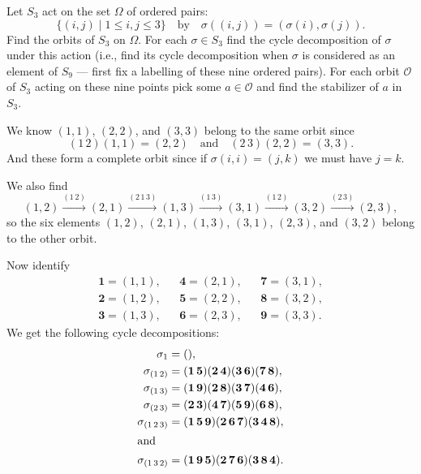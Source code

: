  Let $S_3$ act on the set $\Omega$ of ordered pairs:
\begin{equation*}
  \{(i,j)\mid1\leq i,j\leq3\} \quad\text{by}\quad
  \sigma((i,j)) = (\sigma(i), \sigma(j)).
\end{equation*}
Find the orbits of $S_3$ on $\Omega$. For each $\sigma\in S_3$ find
the cycle decomposition of $\sigma$ under this action (i.e., find its
cycle decomposition when $\sigma$ is considered as an element of $S_9$
--- first fix a labelling of these nine ordered pairs). For each orbit
$\mathcal{O}$ of $S_3$ acting on these nine points pick some
$a\in\mathcal{O}$ and find the stabilizer of $a$ in $S_3$.
\begin{solution}
  We know $(1,1)$, $(2,2)$, and $(3,3)$ belong to the same orbit since
  \begin{equation*}
    (1\,2)(1,1) = (2,2) \quad\text{and}\quad
    (2\,3)(2,2) = (3,3).
  \end{equation*}
  And these form a complete orbit since if $\sigma(i,i) = (j,k)$ we
  must have $j = k$.

  We also find
  \begin{equation*}
    (1,2)
    \xrightarrow{(1\,2)} (2,1)
    \xrightarrow{(2\,1\,3)} (1,3)
    \xrightarrow{(1\,3)} (3,1)
    \xrightarrow{(1\,2)} (3,2)
    \xrightarrow{(2\,3)} (2,3),
  \end{equation*}
  so the six elements $(1,2)$, $(2,1)$, $(1,3)$, $(3,1)$, $(2,3)$, and
  $(3,2)$ belong to the other orbit.

  Now identify
  \begin{align*}
    \mathbf1 = (1,1), && \mathbf4 = (2,1), && \mathbf7 = (3,1), \\
    \mathbf2 = (1,2), && \mathbf5 = (2,2), && \mathbf8 = (3,2), \\
    \mathbf3 = (1,3), && \mathbf6 = (2,3), && \mathbf9 = (3,3).
  \end{align*}
  We get the following cycle decompositions:
  \begin{align*}
    \sigma_1
    &= (), \\
    \sigma_{(1\,2)}
    &= (\mathbf1\,\mathbf5)(\mathbf2\,\mathbf4)
      (\mathbf3\,\mathbf6)(\mathbf7\,\mathbf8), \\
    \sigma_{(1\,3)}
    &= (\mathbf1\,\mathbf9)(\mathbf2\,\mathbf8)
      (\mathbf3\,\mathbf7)(\mathbf4\,\mathbf6), \\
    \sigma_{(2\,3)}
    &= (\mathbf2\,\mathbf3)(\mathbf4\,\mathbf7)
      (\mathbf5\,\mathbf9)(\mathbf6\,\mathbf8), \\
    \sigma_{(1\,2\,3)}
    &= (\mathbf1\,\mathbf5\,\mathbf9)(\mathbf2\,\mathbf6\,\mathbf7)
      (\mathbf3\,\mathbf4\,\mathbf8), \\
    \intertext{and}
    \sigma_{(1\,3\,2)}
    &= (\mathbf1\,\mathbf9\,\mathbf5)(\mathbf2\,\mathbf7\,\mathbf6)
      (\mathbf3\,\mathbf8\,\mathbf4).
  \end{align*}


\end{solution}
